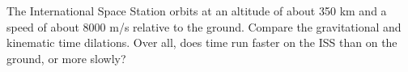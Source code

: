 The International Space Station orbits at an altitude of about 350 km and a speed of about 8000 m/s relative to the
ground. Compare the gravitational and kinematic time dilations. Over all, does
time run faster on the ISS than on the ground, or more slowly?
